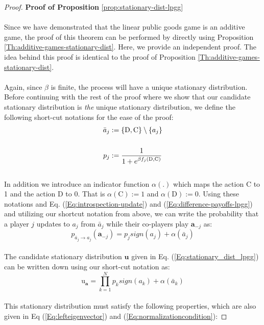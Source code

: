 \documentclass[11pt]{article}
\theoremstyle{plainCl1}
\theoremstyle{plainCl2}
\newcommand{\abf}{\mathbf{a}}
\newcommand{\ubf}{\mathbf{u}}
\newcommand{\C}{\mathrm{C}}
\newcommand{\D}{\mathrm{D}}
\begin{document}
\begin{proof}
\textbf{Proof of Proposition} \ref{prop:stationary-dist-lpgg} \\ \\
Since we have demonstrated that the linear public goods game is an additive game, the proof of this theorem can be performed by directly using Proposition \ref{Th:additive-games-stationary-dist}. Here, we provide an independent proof. The idea behind this proof is identical to the proof of Proposition \ref{Th:additive-games-stationary-dist}. \\ \\
\noindent Again, since $\beta$ is finite, the process will have a unique stationary distribution. Before continuing with the rest of the proof where we show that our candidate stationary distribution is \emph{the} unique stationary distribution, we define the following short-cut notations for the ease of the proof: 
\begin{align}
\bar{a}_j &:= \{\D,\C\} \setminus \{a_j\}  \\ \notag \\ 
p_j &:= \frac{1}{1 + \displaystyle e^{\beta f_j(\D, \C)}} 
\end{align} \\
In addition we introduce an indicator function $\alpha(.)$ which maps the action $\C$ to 1 and the action $\D$ to 0. That is $\alpha(\C) := 1$ and $\alpha(\D) := 0$. Using these notations and Eq. (\ref{Eq:introspection-update}) and (\ref{Eq:difference-payoffs-lpgg}) and utilizing our shortcut notation from above, we can write the probability that a player $j$ updates to $a_j$ from $\bar{a}_j$ while their co-players play $\abf_{-j}$ as: \\
\begin{equation}
p_{\displaystyle \bar{a}_j  \to a_j} (\abf_{-j}) = p_j \mathit{sign}(a_j) + \alpha(\bar{a}_j) 
\end{equation}\\
The candidate stationary distribution $\ubf$ given in Eq. (\ref{Eq:stationary_dist_lpgg}) can be written down using our short-cut notation as: \\
\begin{equation}
\label{Eq:stationary-dist-shortcut}
\mathrm{u}_\abf = \prod_{k = 1}^{N}  p_k \mathit{sign}(a_k) + \alpha(\bar{a}_k)
\end{equation}\\
This stationary distribution must satisfy the following properties, which are also given in Eq  (\ref{Eq:lefteigenvector}) and (\ref{Eq:normalizationcondition}):

\end{proof}
\end{document}
